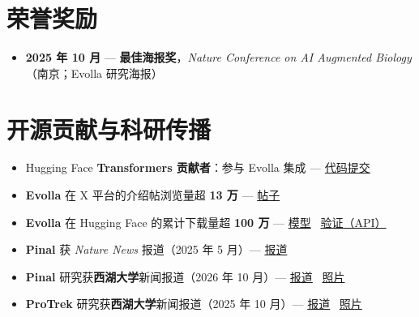 \documentclass[10pt]{article}
\begin{document}
\section*{荣誉奖励}
\begin{itemize}
    \item \textbf{2025 年 10 月} --- \textbf{最佳海报奖}，\textit{Nature Conference on AI Augmented Biology}（南京；Evolla 研究海报）
\end{itemize}

\section*{开源贡献与科研传播}
\begin{itemize}
    \item Hugging Face \textbf{Transformers 贡献者}：参与 Evolla 集成 --- \href{https://github.com/huggingface/transformers/commit/45c7bfb1571160d2c06b880073a5c73e6bfa3677}{代码提交}
    \item \textbf{Evolla} 在 X 平台的介绍帖浏览量超 \textbf{13 万} --- \href{https://x.com/duguyuan/status/1876446845951492221}{帖子}
    \item \textbf{Evolla} 在 Hugging Face 的累计下载量超 \textbf{100 万} --- \href{https://huggingface.co/westlake-repl/Evolla-10B-hf}{模型} \textbar\ \href{https://huggingface.co/api/models/westlake-repl/Evolla-10B-hf?expand\%5B\%5D=downloadsAllTime}{验证（API）}
    \item \textbf{Pinal} 获 \textit{Nature News} 报道（2025 年 5 月）--- \href{https://www.nature.com/articles/d41586-025-01586-y}{报道}
    \item \textbf{Pinal} 研究获\textbf{西湖大学}新闻报道（2026 年 10 月）--- \href{https://www.westlake.edu.cn/news_events/westlakenews/Research/202610/t20261022_70597.html}{报道} \textbar\ \href{https://zhoubay.github.io/files/evidence/westlake-press-pinal.png}{照片}
    \item \textbf{ProTrek} 研究获\textbf{西湖大学}新闻报道（2025 年 10 月）--- \href{https://www.westlake.edu.cn/news_events/westlakenews/Research/202510/t20251030_60873.html}{报道} \textbar\ \href{https://zhoubay.github.io/files/evidence/westlake-press.jpg}{照片}
\end{itemize}

\end{document}
